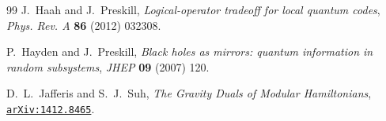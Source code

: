 \documentclass[12pt]{article}
\theoremstyle{plain}
\theoremstyle{plain}
\theoremstyle{plain}
\theoremstyle{plain}
\theoremstyle{result}
\theoremstyle{remark}
\theoremstyle{conjecture}
\theoremstyle{observation}
\theoremstyle{definition}
\theoremstyle{corollary}
\theoremstyle{definition}
\theoremstyle{definition}
\theoremstyle{assumption}
\theoremstyle{definition}
\theoremstyle{problem}
\theoremstyle{fact}
\begin{document}
\begin{thebibliography}{99}
J.~Haah and J.~Preskill, {\it {Logical-operator tradeoff for local quantum
  codes}},  {\em Phys. Rev. A} {\bf 86} (2012) 032308.

P.~Hayden and J.~Preskill, {\it Black holes as mirrors: quantum information in
  random subsystems},  {\em JHEP} {\bf 09} (2007) 120.

 D.~L.~Jafferis and S.~J.~Suh, {\it {The Gravity Duals of Modular Hamiltonians}},
  \href{http://arxiv.org/abs/1412.8465}{{\tt arXiv:1412.8465}}.

\end{thebibliography}\endgroup
\end{document}
